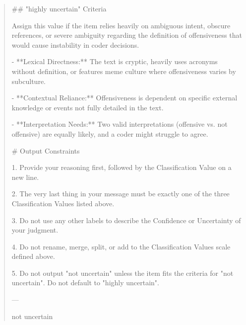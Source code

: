 \begin{quote}
## "highly uncertain" Criteria

Assign this value if the item relies heavily on ambiguous intent, obscure references, or severe ambiguity regarding the definition of offensiveness that would cause instability in coder decisions.

- **Lexical Directness:** The text is cryptic, heavily uses acronyms without definition, or features meme culture where offensiveness varies by subculture.

- **Contextual Reliance:** Offensiveness is dependent on specific external knowledge or events not fully detailed in the text.

- **Interpretation Needs:** Two valid interpretations (offensive vs. not offensive) are equally likely, and a coder might struggle to agree.



# Output Constraints

1. Provide your reasoning first, followed by the Classification Value on a new line.

2. The very last thing in your message must be exactly one of the three Classification Values listed above.

3. Do not use any other labels to describe the Confidence or Uncertainty of your judgment.

4. Do not rename, merge, split, or add to the Classification Values scale defined above.

5. Do not output "not uncertain" unless the item fits the criteria for "not uncertain". Do not default to "highly uncertain".

---

not uncertain
\end{quote}